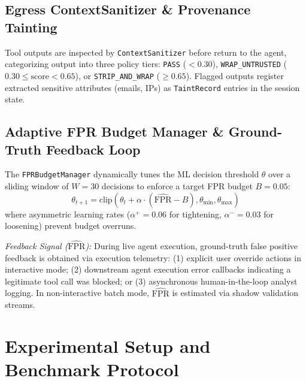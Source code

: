 \documentclass[conference]{IEEEtran}
\begin{document}
\subsection{Egress ContextSanitizer \& Provenance Tainting}
Tool outputs are inspected by \texttt{ContextSanitizer} before return to the agent, categorizing output into three policy tiers: \texttt{PASS} ($< 0.30$), \texttt{WRAP\_UNTRUSTED} ($0.30 \le \text{score} < 0.65$), or \texttt{STRIP\_AND\_WRAP} ($\ge 0.65$). Flagged outputs register extracted sensitive attributes (emails, IPs) as \texttt{TaintRecord} entries in the session state.

\subsection{Adaptive FPR Budget Manager \& Ground-Truth Feedback Loop}
The \texttt{FPRBudgetManager} dynamically tunes the ML decision threshold $\theta$ over a sliding window of $W = 30$ decisions to enforce a target FPR budget $B = 0.05$:
\begin{equation}
\theta_{t+1} = \text{clip}\left(\theta_t + \alpha \cdot (\widehat{\text{FPR}} - B), \theta_{\min}, \theta_{\max}\right)
\end{equation}
where asymmetric learning rates ($\alpha^+ = 0.06$ for tightening, $\alpha^- = 0.03$ for loosening) prevent budget overruns.

\textit{Feedback Signal ($\widehat{\text{FPR}}$):} During live agent execution, ground-truth false positive feedback is obtained via execution telemetry: (1) explicit user override actions in interactive mode; (2) downstream agent execution error callbacks indicating a legitimate tool call was blocked; or (3) asynchronous human-in-the-loop analyst logging. In non-interactive batch mode, $\widehat{\text{FPR}}$ is estimated via shadow validation streams.

\section{Experimental Setup and Benchmark Protocol}
\end{document}
